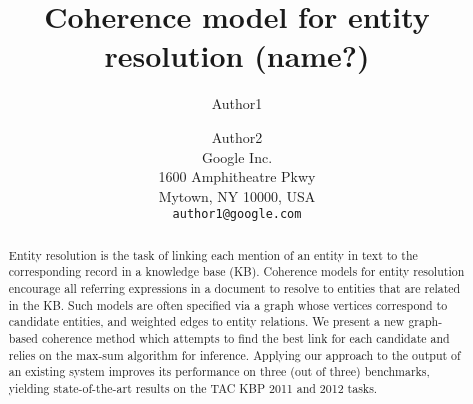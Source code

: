 \documentclass[11pt,letterpaper]{article}
\title{Coherence model for entity resolution (name?)}
\author{Author1 \and Author2\\
	    Google Inc. \\
	    1600 Amphitheatre Pkwy\\
	    Mytown, NY 10000, USA\\
	    {\tt author1@google.com}}
\date{}
\begin{document}
\maketitle

\begin{abstract}
Entity resolution is the task of linking each mention of an entity in text to the corresponding record in a knowledge base (KB). Coherence models for entity resolution encourage all referring expressions in a document to resolve to entities that are related in the KB. 
Such models are often specified via a graph whose vertices correspond to candidate entities, and weighted edges to entity relations. We present a new graph-based coherence method which attempts to find the best link for each candidate and relies on the max-sum algorithm for inference.  Applying our approach to the output of an existing system improves its performance on three (out of three) benchmarks, yielding state-of-the-art results on the TAC KBP 2011 and 2012 tasks.
\end{abstract}




\end{document}
